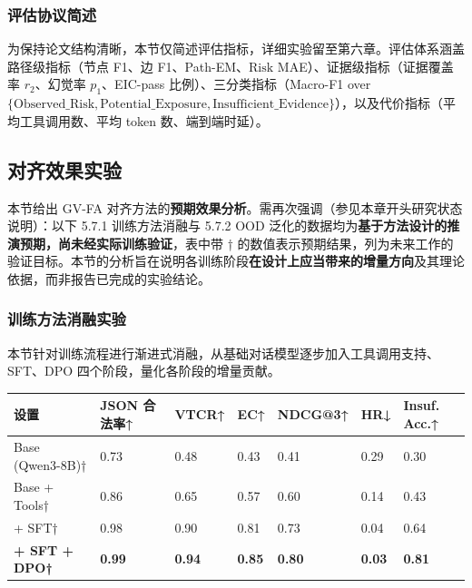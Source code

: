 \documentclass[a4paper,12pt]{ctexart}
\begin{document}
\subsubsection{评估协议简述}

为保持论文结构清晰，本节仅简述评估指标，详细实验留至第六章。评估体系涵盖路径级指标（节点 F1、边 F1、Path-EM、$\mathrm{Risk}$ MAE）、证据级指标（证据覆盖率 $r_2$、幻觉率 $p_1$、EIC-pass 比例）、三分类指标（Macro-F1 over $\{\text{Observed\_Risk}, \text{Potential\_Exposure}, \text{Insufficient\_Evidence}\}$），以及代价指标（平均工具调用数、平均 token 数、端到端时延）。

\subsection{对齐效果实验}

本节给出 GV-FA 对齐方法的\textbf{预期效果分析}。需再次强调（参见本章开头研究状态说明）：以下 5.7.1 训练方法消融与 5.7.2 OOD 泛化的数据均为\textbf{基于方法设计的推演预期，尚未经实际训练验证}，表中带 † 的数值表示预期结果，列为未来工作的验证目标。本节的分析旨在说明各训练阶段\textbf{在设计上应当带来的增量方向}及其理论依据，而非报告已完成的实验结论。

\subsubsection{训练方法消融实验}

本节针对训练流程进行渐进式消融，从基础对话模型逐步加入工具调用支持、SFT、DPO 四个阶段，量化各阶段的增量贡献。

\begin{table}[htbp]
\centering
\small
\setlength{\tabcolsep}{4pt}
\begin{tabular}{|l|l|l|l|l|l|l|}
\hline
\textbf{设置} & \textbf{JSON 合法率↑} & \textbf{VTCR↑} & \textbf{EC↑} & \textbf{NDCG@3↑} & \textbf{HR↓} & \textbf{Insuf. Acc.↑} \\
\hline
Base (Qwen3-8B)† & 0.73 & 0.48 & 0.43 & 0.41 & 0.29 & 0.30 \\
\hline
Base + Tools† & 0.86 & 0.65 & 0.57 & 0.60 & 0.14 & 0.43 \\
\hline
+ SFT† & 0.98 & 0.90 & 0.81 & 0.73 & 0.04 & 0.64 \\
\hline
\textbf{+ SFT + DPO†} & \textbf{0.99} & \textbf{0.94} & \textbf{0.85} & \textbf{0.80} & \textbf{0.03} & \textbf{0.81} \\
\hline
\end{tabular}
\end{table}
\end{document}
